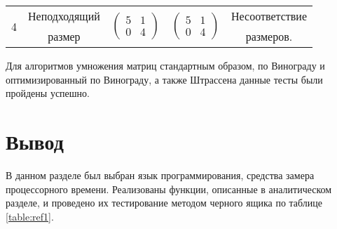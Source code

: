 \begin{table}[H]
\begin{tabular}{|c|c|c|c|c|}
		\\ \hline
		\multirow{2}{*}{4}  &Неподходящий
		& \multirow{2}{*}{$\begin{pmatrix}5 & 1\\0 & 4\end{pmatrix}$}
		& \multirow{2}{*}{$\begin{pmatrix}5 & 1\\0 & 4\end{pmatrix}$}
		& Несоответствие\\
		&размер & & &размеров.
		\\ \hline
	\end{tabular}
\end{table}
Для алгоритмов умножения матриц стандартным образом, по Винограду и оптимизированный по Винограду, а также Штрассена данные тесты были пройдены успешно.
\section*{Вывод}
В данном разделе был выбран язык программирования, средства замера процессорного времени. Реализованы функции, описанные в аналитическом разделе, и проведено их тестирование методом черного ящика по таблице \ref{table:ref1}. 
